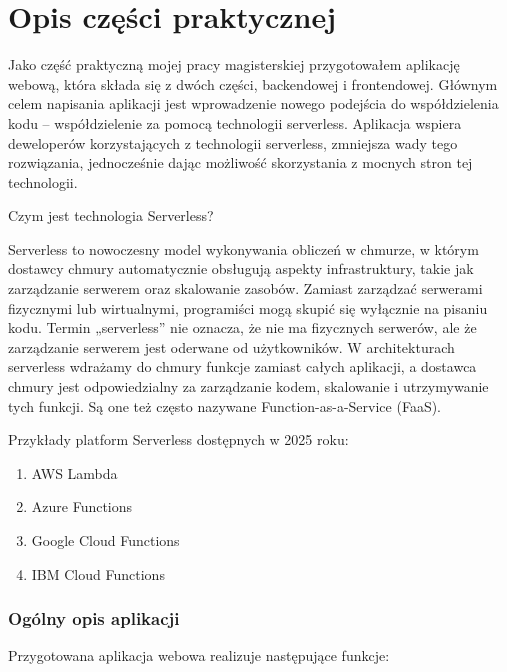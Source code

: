 \documentclass[runningheads,12pt]{llncs}
\begin{document}
\section{Opis części praktycznej}

Jako część praktyczną mojej pracy magisterskiej przygotowałem aplikację webową, która składa się z dwóch części, backendowej i frontendowej.
Głównym celem napisania aplikacji jest wprowadzenie nowego podejścia do współdzielenia kodu – współdzielenie za pomocą technologii serverless. Aplikacja wspiera deweloperów korzystających z technologii serverless, zmniejsza wady tego rozwiązania, jednocześnie dając możliwość skorzystania z mocnych stron tej technologii.

Czym jest technologia Serverless?

Serverless to nowoczesny model wykonywania obliczeń w chmurze, w którym dostawcy chmury automatycznie obsługują aspekty infrastruktury, takie jak zarządzanie serwerem oraz skalowanie zasobów. Zamiast zarządzać serwerami fizycznymi lub wirtualnymi, programiści mogą skupić się wyłącznie na pisaniu kodu. Termin „serverless” nie oznacza, że nie ma fizycznych serwerów, ale że zarządzanie serwerem jest oderwane od użytkowników. W architekturach serverless wdrażamy do chmury funkcje zamiast całych aplikacji, a dostawca chmury jest odpowiedzialny za zarządzanie kodem, skalowanie i utrzymywanie tych funkcji. Są one też często nazywane Function-as-a-Service (FaaS).

Przykłady platform Serverless dostępnych w 2025 roku:

\begin{enumerate}
    \item AWS Lambda 
    \item Azure Functions 
    \item Google Cloud Functions 
    \item IBM Cloud Functions 
\end{enumerate}

\subsubsection{Ogólny opis aplikacji}

Przygotowana aplikacja webowa realizuje następujące funkcje:
\end{document}
